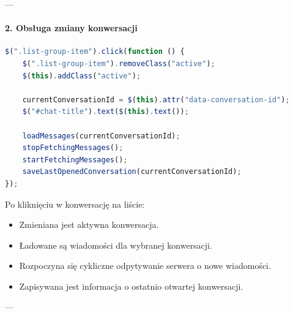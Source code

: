 \documentclass[12pt,a4paper,oneside]{article}
\theoremstyle{definition}
\numberwithin{equation}{section}
\begin{document}
---

\paragraph{2. Obsługa zmiany konwersacji}
\begin{lstlisting}[language=JavaScript, caption=Obsługa zmiany konwersacji]
$(".list-group-item").click(function () {
    $(".list-group-item").removeClass("active");
    $(this).addClass("active");

    currentConversationId = $(this).attr("data-conversation-id");
    $("#chat-title").text($(this).text());

    loadMessages(currentConversationId);
    stopFetchingMessages();
    startFetchingMessages();
    saveLastOpenedConversation(currentConversationId);
});
\end{lstlisting}
Po kliknięciu w konwersację na liście:
\begin{itemize}
    \item Zmieniana jest aktywna konwersacja.
    \item Ładowane są wiadomości dla wybranej konwersacji.
    \item Rozpoczyna się cykliczne odpytywanie serwera o nowe wiadomości.
    \item Zapisywana jest informacja o ostatnio otwartej konwersacji.
\end{itemize}

---
\end{document}
